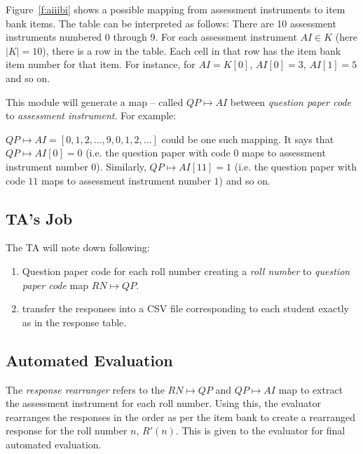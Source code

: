 \documentclass[12pt]{report}
\begin{document}
Figure~\ref{f:aiiibi} shows a possible mapping from assessment instruments to item bank items. The table can be interpreted as follows: There are 10 assessment instruments numbered 0 through 9. For each assessment instrument $AI \in K$ (here $|K| = 10$), there is a row in the table. Each cell in that row has the item bank item number for that item. For instance, for $AI = K[0]$, $AI[0] = 3$, $AI[1] = 5$ and so on.
  
This module will generate a map -- called $QP\mapsto AI$ between \emph{question paper code} to \emph{assessment instrument}. For example:

$QP\mapsto AI = [0, 1, 2, ..., 9, 0, 1, 2, ...]$ could be one such mapping. It says that $QP\mapsto AI[0] = 0$ (i.e. the question paper with code $0$ maps to assessment instrument number $0$). Similarly, $QP\mapsto AI[11] = 1$ (i.e. the question paper with code $11$ maps to assessment instrument number $1$) and so on.

\subsection{TA's Job}
The TA will note down following:
\begin{enumerate}
\item Question paper code for each roll number creating a \emph{roll number} to \emph{question paper code} map $RN\mapsto QP$.
\item transfer the responses into a CSV file corresponding to each student exactly as in the response table.
\end{enumerate}

\subsection{Automated Evaluation}
The \emph{response rearranger} refers to the $RN\mapsto QP$ and $QP\mapsto AI$ map to extract the assessment instrument for each roll number. Using this, the evaluator rearranges the responses in the order as per the item bank to create a rearranged response for the roll number $n$, $R'(n)$. This is given to the evaluator for final automated evaluation.
\end{document}
